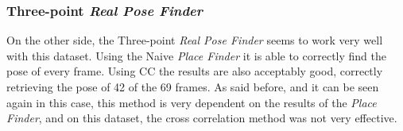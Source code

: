 \subsubsection{Three-point \textit{Real Pose Finder}}
\label{ssub:large_three_point_real_pose_finder}

On the other side, the Three-point \textit{Real Pose Finder} seems to work very well with this dataset. Using the Naive \textit{Place Finder} it is able to correctly find the pose of every frame. Using CC the results are also acceptably good, correctly retrieving the pose of 42 of the 69 frames. As said before, and it can be seen again in this case, this method is very dependent on the results of the \textit{Place Finder}, and on this dataset, the cross correlation method was not very effective.\\


